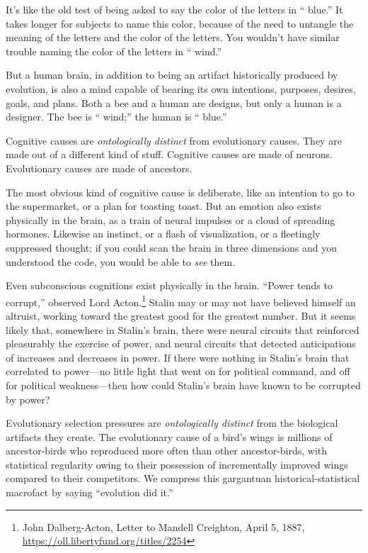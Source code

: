  It's like the old test of being asked to say the
color of the letters in ``{\color{red} blue}.'' It
takes longer for subjects to name this color, because of the need to
untangle the meaning of the letters and the color of the letters. You
wouldn't have similar trouble naming the color of the
letters in ``{\color{green} wind}.''


 But a human brain, in addition to being an artifact historically
produced by evolution, is also a mind capable of bearing its own
intentions, purposes, desires, goals, and plans. Both a bee and a human
are designs, but only a human is a designer. The bee is
``{\color{green} wind};'' the human is
``{\color{red} blue}.''


 Cognitive causes are \textit{ontologically distinct} from
evolutionary causes. They are made out of a different kind of stuff.
Cognitive causes are made of neurons. Evolutionary causes are made of
ancestors.


 The most obvious kind of cognitive cause is deliberate, like an
intention to go to the supermarket, or a plan for toasting toast. But
an emotion also exists physically in the brain, as a train of neural
impulses or a cloud of spreading hormones. Likewise an instinct, or a
flash of visualization, or a fleetingly suppressed thought; if you
could scan the brain in three dimensions and you understood the code,
you would be able to \textit{see} them.


 Even subconscious cognitions exist physically in the brain.
``Power tends to corrupt,'' observed
Lord Acton.\footnote{John Dalberg-Acton, Letter to Mandell Creighton, April 5, 1887, \url{https://oll.libertyfund.org/titles/2254}} Stalin may or may not have believed himself an altruist,
working toward the greatest good for the greatest number. But it seems
likely that, somewhere in Stalin's brain, there were
neural circuits that reinforced pleasurably the exercise of power, and
neural circuits that detected anticipations of increases and decreases
in power. If there were nothing in Stalin's brain that
correlated to power---no little light that went on for political
command, and off for political weakness---then how could
Stalin's brain have known to be corrupted by power?


 Evolutionary selection pressures are \textit{ontologically
distinct} from the biological artifacts they create. The evolutionary
cause of a bird's wings is millions of ancestor-birds
who reproduced more often than other ancestor-birds, with statistical
regularity owing to their possession of incrementally improved wings
compared to their competitors. We compress this gargantuan
historical-statistical macrofact by saying ``evolution
did it.''


